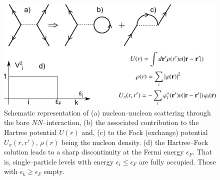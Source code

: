  \begin{figure}[h!] \centerline{\includegraphics*[width=\textwidth,angle=0]{nutshell/figs/diagrams1.pdf}}
 \caption{Schematic representation of (a) nucleon--nucleon scattering through the bare $NN$--interaction, (b) the associated contribution to the Hartree potential $U(r)$ and, (c) to the Fock (exchange) potential $U_x(r,r')$, $\rho(r)$ being the nucleon density. (d) the Hartree--Fock solution leads to a sharp discontinuity at the Fermi energy $\epsilon_F$. That is, single--particle levels with energy $\epsilon_i\leq \epsilon_F$ are fully occupied. Those with $\epsilon_k\geq \epsilon_F$ empty.}\label{fig1A2}
 \end{figure}
 \newpage
 
